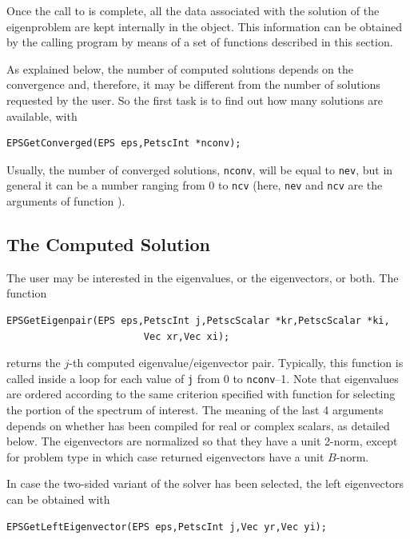 Once the call to  is complete, all the data associated with the solution of the eigenproblem are kept internally in the  object. This information can be obtained by the calling program by means of a set of functions described in this section.

	As explained below, the number of computed solutions depends on the convergence and, therefore, it may be different from the number of solutions requested by the user. So the first task is to find out how many solutions are available, with
	\begin{Verbatim}[fontsize=\small]
	EPSGetConverged(EPS eps,PetscInt *nconv);
	\end{Verbatim}
Usually, the number of converged solutions, \texttt{nconv}, will be equal to \texttt{nev}, but in general it can be a number ranging from 0 to \texttt{ncv} (here, \texttt{nev} and \texttt{ncv} are the arguments of function ).

\subsection{The Computed Solution}

	The user may be interested in the eigenvalues, or the eigenvectors, or both. The function
	\begin{Verbatim}[fontsize=\small]
	EPSGetEigenpair(EPS eps,PetscInt j,PetscScalar *kr,PetscScalar *ki,
                        Vec xr,Vec xi);
	\end{Verbatim}
returns the $j$-th computed eigenvalue/eigenvector pair. Typically, this function is called inside a loop for each value of \texttt{j} from 0 to \texttt{nconv}--1. Note that eigenvalues are ordered according to the same criterion specified with function  for selecting the portion of the spectrum of interest.
	The meaning of the last 4 arguments depends on whether \slepc has been compiled for real or complex scalars, as detailed below. The eigenvectors are normalized so that they have a unit 2-norm, except for problem type  in which case returned eigenvectors have a unit $B$-norm.

	In case the two-sided variant of the solver has been selected, the left eigenvectors can be obtained with
	\begin{Verbatim}[fontsize=\small]
	EPSGetLeftEigenvector(EPS eps,PetscInt j,Vec yr,Vec yi);
	\end{Verbatim}

